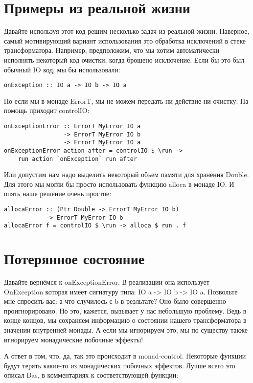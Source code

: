 \section{Примеры из реальной жизни}
Давайте используя этот код решим несколько задач из реальной жизни. Наверное,
самый мотивирующий вариант использования это обработка исключений в стеке
трансформатора. Например, предположим, что мы хотим автоматически исполнять
некоторый код очистки, когда брошено исключение. Если бы это был обычный IO
код, мы бы использовали:

\begin{lstlisting}
onException :: IO a -> IO b -> IO a
\end{lstlisting}

Но если мы в монаде ErrorT, мы не можем передать ни действие ни очистку. На
помощь приходит controlIO:

\begin{lstlisting}
onExceptionError :: ErrorT MyError IO a
                 -> ErrorT MyError IO b
                 -> ErrorT MyError IO a
onExceptionError action after = controlIO $ \run ->
    run action `onException` run after
\end{lstlisting}

Или допустим нам надо выделить некоторый объем памяти для хранения Double. Для
этого мы могли бы просто использовать функцию alloca в монаде IO. И опять наше
решение очень простое:

\begin{lstlisting}
allocaError :: (Ptr Double -> ErrorT MyError IO b)
            -> ErrorT MyError IO b
allocaError f = controlIO $ \run -> alloca $ run . f
\end{lstlisting}

\section{Потерянное состояние}
Давайте вернёмся к onExceptionError. В реализации она использует OnException
которая имеет сигнатуру типа: IO a -> IO b -> IO a. Позвольте мне спросить вас:
а что случилось с b в резльтате? Оно было совершенно проигнорировано. Но это,
кажется, вызывает у нас небольшую проблему. Ведь в конце концов, мы сохраняем
информацию о состоянии нашего трансформатора в значении внутренней монады. А
если мы игнорируем это, мы по существу также игнорируем монадические побочные
эффекты!

А ответ в том, что, да, так это происходит в monad-control. Некоторые функции
будут терять какие-то из монадических побочных эффектов. Лучше всего это описал
Bas, в комментариях к соответствующей функции:

